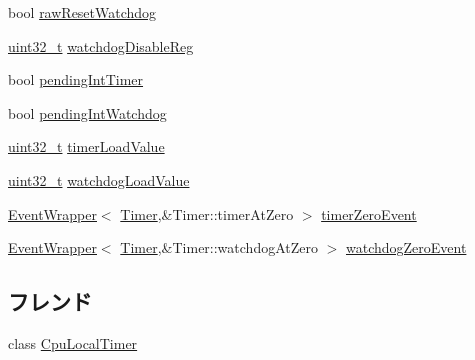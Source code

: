 \begin{DoxyCompactItemize}
bool \hyperlink{classCpuLocalTimer_1_1Timer_a891d61f784db1e83addbb06b7487079e}{rawResetWatchdog}
\item 
\hyperlink{Type_8hh_a435d1572bf3f880d55459d9805097f62}{uint32\_\-t} \hyperlink{classCpuLocalTimer_1_1Timer_a51372d5fcba85069b5e5bba466ec6832}{watchdogDisableReg}
\item 
bool \hyperlink{classCpuLocalTimer_1_1Timer_a357b071730029e981be07c885c7ec91d}{pendingIntTimer}
\item 
bool \hyperlink{classCpuLocalTimer_1_1Timer_a663bde1c5f669163f0ca90a9042455f9}{pendingIntWatchdog}
\item 
\hyperlink{Type_8hh_a435d1572bf3f880d55459d9805097f62}{uint32\_\-t} \hyperlink{classCpuLocalTimer_1_1Timer_ab938cbb5083da16d0b1be708229eca72}{timerLoadValue}
\item 
\hyperlink{Type_8hh_a435d1572bf3f880d55459d9805097f62}{uint32\_\-t} \hyperlink{classCpuLocalTimer_1_1Timer_a1bc95b558c126e9393d024f8f7631549}{watchdogLoadValue}
\item 
\hyperlink{classEventWrapper}{EventWrapper}$<$ \hyperlink{classCpuLocalTimer_1_1Timer}{Timer},\&Timer::timerAtZero $>$ \hyperlink{classCpuLocalTimer_1_1Timer_aef3335c9e81dcad22a8575d136b7f21a}{timerZeroEvent}
\item 
\hyperlink{classEventWrapper}{EventWrapper}$<$ \hyperlink{classCpuLocalTimer_1_1Timer}{Timer},\&Timer::watchdogAtZero $>$ \hyperlink{classCpuLocalTimer_1_1Timer_a6129a6827c6187d04c345125489dda09}{watchdogZeroEvent}
\end{DoxyCompactItemize}
\subsection*{フレンド}
\begin{DoxyCompactItemize}
\item 
class \hyperlink{classCpuLocalTimer_1_1Timer_a1253a9bb7a93e1c7e63e736285a35c2f}{CpuLocalTimer}
\end{DoxyCompactItemize}


